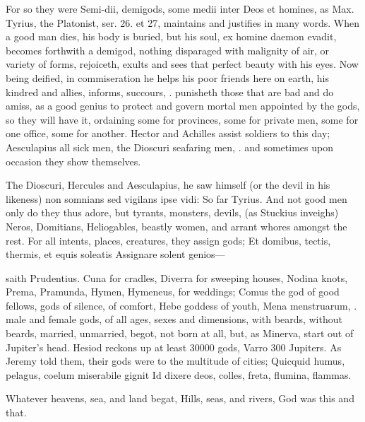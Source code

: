 {For so they were Semi-dii, demigods, some medii inter Deos et homines,
as Max. Tyrius, the Platonist, ser. 26. et 27, maintains and
justifies in many words. When a good man dies, his body is buried, but
his soul, ex homine daemon evadit, becomes forthwith a demigod, nothing
disparaged with malignity of air, or variety of forms, rejoiceth,
exults and sees that perfect beauty with his eyes. Now being deified,
in commiseration he helps his poor friends here on earth, his kindred
and allies, informs, succours, \etc{}. punisheth those that are bad and do
amiss, as a good genius to protect and govern mortal men appointed by
the gods, so they will have it, ordaining some for provinces, some for
private men, some for one office, some for another. Hector and Achilles
assist soldiers to this day; Aesculapius all sick men, the Dioscuri
seafaring men, \etc{}. and sometimes upon occasion they show themselves.

The Dioscuri, Hercules and Aesculapius, he saw himself (or the devil in
his likeness) non somnians sed vigilans ipse vidi: So far Tyrius. And
not good men only do they thus adore, but tyrants, monsters, devils,
(as  Stuckius inveighs) Neros, Domitians, Heliogables, beastly
women, and arrant whores amongst the rest. For all intents, places,
creatures, they assign gods;
Et domibus, tectis, thermis, et equis soleatis
Assignare solent genios---

saith Prudentius. Cuna for cradles, Diverra for sweeping houses, Nodina
knots, Prema, Pramunda, Hymen, Hymeneus, for weddings; Comus the god of
good fellows, gods of silence, of comfort, Hebe goddess of youth, Mena
menstruarum, \etc{}. male and female gods, of all ages, sexes and
dimensions, with beards, without beards, married, unmarried, begot, not
born at all, but, as Minerva, start out of Jupiter's head. Hesiod
reckons up at least 30\thinspace{}000 gods, Varro 300 Jupiters. As Jeremy told
them, their gods were to the multitude of cities;
Quicquid humus, pelagus, coelum miserabile gignit
Id dixere deos, colles, freta, flumina, flammas.

Whatever heavens, sea, and land begat,
Hills, seas, and rivers, God was this and that.

}

